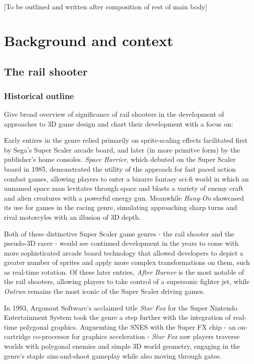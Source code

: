 \documentclass[11pt]{article}
\begin{document}
[To be outlined and written after composition of rest of main body]


\section{Background and context}

\subsection{The rail shooter}\label{genre}

\subsubsection*{Historical outline}
Give broad overview of significance of rail shooters in the development of approaches
to 3D game design and chart their development with a focus on:

Early entires in the genre relied primarily on sprite-scaling effects facilitated first by
Sega's Super Scaler arcade board, and later (in more primitve form) by the publisher's
home consoles. \textit{Space Harrier}\cite{space_harrier}, which debuted on the Super Scaler board in 1985, demonstrated
the utility of the approach for fast paced action combat games, allowing players to enter a bizarre
fantasy sci-fi world in which an unnamed space man levitates through space and blasts a variety of
enemy craft and alien creatures with a powerful energy gun. Meanwhile \textit{Hang-On} showcased its use
for games in the racing genre, simulating approaching sharp turns and rival motorcyles with an illusion
of 3D depth.

Both of these distinctive Super Scaler game genres - the rail shooter and the pseudo-3D
racer - would see continued development in the years to come with more sophisticated arcade board
technology that allowed developers to depict a greater number of sprites and apply more complex
transformations on them, such as real-time rotation. Of these later entries, \textit{After Burner} is the
most notable of the rail shooters, allowing players to take control of a supersonic fighter jet, while
\textit{Outrun} remains the most iconic of the Super Scaler driving games.

In 1993, Argonaut Software's acclaimed title \textit{Star Fox}\cite{star_fox} for the Super Nintendo Entertainment
System took the genre a step further with the integration of real-time polygonal graphics. Auguemting
the SNES with the Super FX chip - an on-cartridge co-processor for graphics acceleration -
\textit{Star Fox} saw players traverse worlds with polygonal enemies and simple 3D world geometry,
engaging in the genre's staple aim-and-shoot gameplay while also moving through gates.
\end{document}
